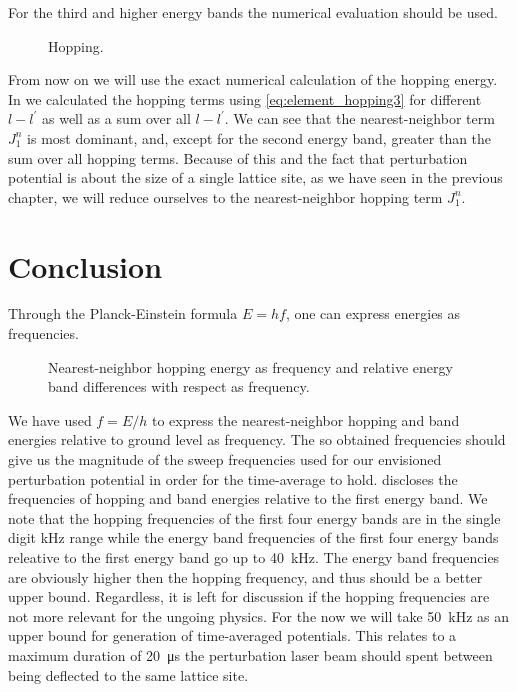 For the third and higher energy bands the numerical evaluation should be used.
\begin{figure}[htb]
  \centering
  \begin{adjustbox}{width=\textwidth}
    
  \end{adjustbox}
  \caption{Hopping.
  }\label{fig:scale_hopping}
\end{figure}
From now on we will use the exact numerical calculation of the hopping energy.
In  we calculated the hopping terms using
\cref{eq:element_hopping3} for different $l-l^\prime$ as well as a sum over
all $l-l^\prime$. We can see that the nearest-neighbor term $J^n_1$ is most
dominant, and, except for the second energy band, greater than the sum over
all hopping terms. Because of this and the fact that perturbation potential
is about the size of a single lattice site, as we have seen in the previous
chapter, we will reduce ourselves to the nearest-neighbor hopping term
$J^n_1$.

\section{Conclusion}

Through the Planck-Einstein formula $E=hf$, one can express energies as
frequencies.
\begin{figure}[htb]
  \centering
  \begin{adjustbox}{width=\textwidth}
    
  \end{adjustbox}
  \caption{Nearest-neighbor hopping energy as frequency and relative energy
    band differences with respect as frequency.
  }\label{fig:scale_frequency}
\end{figure}
We have used $f=E/h$ to express the nearest-neighbor hopping and band
energies relative to ground level as frequency. The so obtained
frequencies should give us the magnitude of the sweep frequencies used for our
envisioned perturbation potential in order for the time-average to hold.
 discloses the frequencies of hopping and band
energies relative to the first energy band. We note that the hopping
frequencies of the first four energy bands are in the single digit
\si{\kilo\hertz} range while the energy band frequencies of the first four
energy bands releative to the first energy band go up to \SI{40}{\kilo\hertz}.
The energy band frequencies are obviously higher then the hopping frequency,
and thus should be a better upper bound. Regardless, it is left for discussion
if the hopping frequencies are not more relevant for the ungoing physics. For
the now we will take \SI{50}{\kilo\hertz} as an upper bound for generation
of time-averaged potentials. This relates to a maximum duration of
\SI{20}{\micro\second} the perturbation laser beam should spent between
being deflected to the same lattice site.

